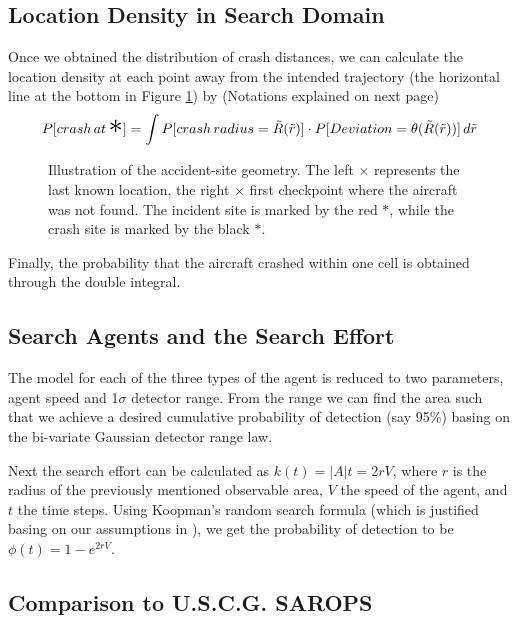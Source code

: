 \documentclass[12pt, letterpaper]{article}  %
\theoremstyle{definition}
\theoremstyle{remark}
\theoremstyle{plain}
\begin{document}
\subsection{Location Density in Search Domain}\label{subsecDist:locd}

Once we obtained the distribution of crash distances, we can calculate the location density at each point away from the intended trajectory (the horizontal line at the bottom in Figure \ref{fig:geom}) by (Notations explained on next page)
\[P[crash\,at\,\text{\huge $\ast$}] = \int P[crash\,radius=\tilde{R}(\tilde{r})]\cdot P[Deviation=\theta(\tilde{R}(\tilde{r}))]\,d\tilde{r}\]

\begin{center}
	\begin{figure}[H]
		\centering
		\caption{Illustration of the accident-site geometry. The left {\large $\times$} represents the last known location, the right {\large $\times$} first checkpoint where the aircraft was not found. The incident site is marked by the red {\huge $\ast$}, while the crash site is marked by the black {\huge $\ast$}.}
		\label{fig:geom}
	\end{figure}
\end{center}

Finally, the probability that the aircraft crashed within one cell is obtained through the double integral.

\subsection{Search Agents and the Search Effort}\label{subsecDist:locd}

The model for each of the three types of the agent is reduced to two parameters, agent speed and 1$\sigma$ detector range. From the range we can find the area such that we achieve a desired cumulative probability of detection (say 95\%) basing on the bi-variate Gaussian detector range law.

Next the search effort can be calculated as $k(t) = |A|t=2rV$, where $r$ is the radius of the previously mentioned observable area, $V$ the speed of the agent, and $t$ the time steps. Using Koopman's random search formula (which is justified basing on our assumptions in \cite{83stone}), we get the probability of detection to be $\phi(t) = 1 - e^{2rV}$.


\subsection{Comparison to U.S.C.G. SAROPS}\label{subsec:sarops}
\end{document}
